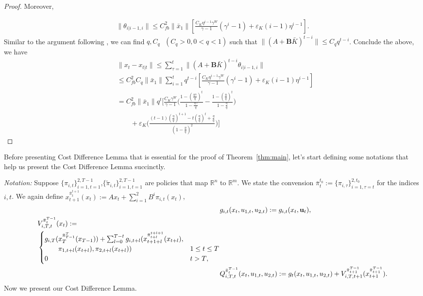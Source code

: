 \documentclass[letterpaper, 10 pt, conference]{ieeeconf}  %
\begin{document}
\begin{proof}
Moreover,

\begin{align*}
    \|\theta_{i|i-1,i}\| \leq C_{fb}^{2}\|\bar{x}_{1}\|[\frac{C_{K}\eta^{i-1}\gamma^{W}}{\gamma-1}(\gamma^{i}-1) + \varepsilon_{K}(i-1)\eta^{i-1}].
\end{align*}
Similar to the argument following \cite[Lemma 10, (25)]{chen_regret_2023}, we can find $q,C_{q}\text{ }(C_{q}>0,0<q<1)$ such that $\|(A+\mathbf{B}\bar{K})^{t-i}\| \leq C_{q}q^{t-i}$. Conclude the above, we have
\begin{align*}
    &\|x_{t}-x_{t|t}\| \leq \sum_{\tau=1}^{t}\|(A+\mathbf{B}\bar{K})^{t-i}\theta_{i|i-1,i}\|\\
    &\leq C_{fb}^{2}C_{q}\|\bar{x}_{1}\|\sum_{i=1}^{t}q^{t-i}[\frac{C_{K}\eta^{i-1}\gamma^{W}}{\gamma-1}(\gamma^{i}-1) + \varepsilon_{K}(i-1)\eta^{i-1}]\\
    &= C_{fb}^{2}\|\bar{x}_{1}\|q^{t}[\frac{C_{K}\gamma^{W}}{\gamma-1}\bigg(\frac{1-(\frac{\eta\gamma}{q})^{t}}{1-\frac{\eta\gamma}{q}} - \frac{1-(\frac{\eta}{q})^{t}}{1-\frac{\eta}{q}} \bigg)\\
    &\qquad+\varepsilon_{K}\bigg(\frac{(t-1)(\frac{\eta}{q})^{t+1}-t(\frac{\eta}{q})^{t}+\frac{\eta}{q}}{(1-\frac{\eta}{q})^{2}}\bigg)]
\end{align*}
\end{proof}

Before presenting Cost Difference Lemma that is essential for the proof of Theorem~\ref{thm:main}, let's start defining some notations that help us present the Cost Difference Lemma succinctly.

\emph{Notation:} 
Suppose $\{\pi_{i,t}\}_{i=1,t=1}^{2,T-1}$,$\{\tilde{\pi}_{i,t}\}_{i=1,t=1}^{2,T-1}$ are policies that map $\mathbb{R}^{n}$ to $\mathbb{R}^{m}$. We state the convension $\bar{\pi}_{t}^{t_{0}} := \{\pi_{i,\tau}\}_{i=1,\tau=t}^{2,t_{0}}$ for the indices $i,t$.
We again define $x_{t+1}^{\bar{\pi}_{t}^{t+1}}(x_{t}):= Ax_{t} + \sum_{i=1}^{2} B^{i}\pi_{i,t}(x_{t})$,
\begin{align*}
&g_{i,t}(x_{t}, u_{1,t}, u_{2,t}) := g_{i,t}(x_{t}, \mathbf{u}_{t}),\\
\begin{split}
    &V_{i,T,t}^{\bar{\pi}_{t}^{T-1}}(x_{t}) := \\
    &\begin{cases}
        g_{i,T}(x_{T}^{\bar{\pi}_{T-1}^{T}}(x_{T-1}))+\sum_{l=0}^{T-t} g_{i,t+l}(x_{t+1+l}^{\bar{\pi}_{t+l}^{t+l+1}}(x_{t+l}),\\
        \qquad \pi_{1,t+l}(x_{t+l}),\pi_{2,t+l}(x_{t+l})) & \text{$1 \leq t \leq T$}\\
        $0$ & \text{$t > T$},
    \end{cases}
\end{split}
    \\
    &Q_{i,T,t}^{\bar{\pi}_{t}^{T-1}}(x_{t},u_{1,t},u_{2,t}) := g_{t}(x_{t},u_{1,t},u_{2,t}) + V_{i,T,t+1}^{\bar{\pi}_{t+1}^{T-1}}(x_{t+1}^{\bar{\pi}_{t+1}^{T-1}}).
\end{align*}
Now we present our Cost Difference Lemma.
\end{document}
